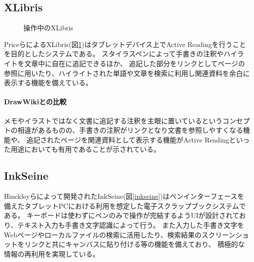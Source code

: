 \subsection{XLibris}
\begin{figure}[H]
    \centering
    \caption{操作中のXLibris}
    \label{fig:xlibris}
\end{figure}
PriceらによるXLibris\cite{Price1998XLibrisTA}(図\ref{fig:xlibris})はタブレットデバイス上でActive Readingを行うことを目的としたシステムである。
スタイラスペンによって手書きの注釈やハイライトを文章中に自在に追記できるほか、
追記した部分をリンクとしてページの参照に用いたり、ハイライトされた単語や文章を検索に利用し関連資料を余白に表示する機能を備えている。

\paragraph*{DrawWikiとの比較}
メモやイラストではなく文書に追記する注釈を主眼に置いているというコンセプトの相違があるものの、手書きの注釈がリンクとなり文書を参照しやすくなる機能や、
追記されたページを関連資料として表示する機能がActive Readingといった用途においても有用であることが示されている。

\subsection{InkSeine}
Hinckleyらによって開発されたInkSeine\cite{Hinckley2007InkSeineIS}(図\ref{inkseine})はペンインターフェースを備えたタブレットPCにおける利用を想定した電子スクラップブックシステムである。
キーボードは使わずにペンのみで操作が完結するようUIが設計されており、テキスト入力も手書き文字認識によって行う。
また入力した手書き文字をWebページやローカルファイルの検索に活用したり、検索結果のスクリーンショットをリンクと共にキャンバスに貼り付ける等の機能を備えており、
積極的な情報の再利用を実現している。

